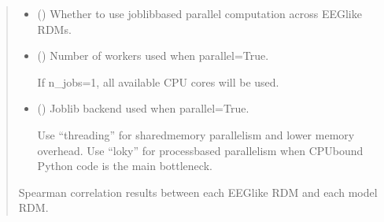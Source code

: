 \documentclass[letterpaper,10pt,english]{sphinxhowto}
\begin{document}
\begin{fulllineitems}
\begin{quote}
\begin{description}
\begin{itemize}
\begin{itemize}
\item {} 
\sphinxAtStartPar
{[}n1, n\_cons, n\_cons{]}

\item {} 
\sphinxAtStartPar
{[}n1, n2, n\_cons, n\_cons{]}

\item {} 
\sphinxAtStartPar
{[}n1, n2, n3, n\_cons, n\_cons{]}

\end{itemize}

\sphinxAtStartPar
The leading dimensions can represent time windows, channels, subjects,
or other analysis dimensions.


\item {} 
\sphinxAtStartPar
{} (\sphinxstyleliteralemphasis{\sphinxupquote{, }}) \textendash{} Whether to use joblib\sphinxhyphen{}based parallel computation across EEG\sphinxhyphen{}like RDMs.

\item {} 
\sphinxAtStartPar
{} (\sphinxstyleliteralemphasis{\sphinxupquote{, }}) \textendash{} 
\sphinxAtStartPar
Number of workers used when parallel=True.

\sphinxAtStartPar
If n\_jobs=\sphinxhyphen{}1, all available CPU cores will be used.


\item {} 
\sphinxAtStartPar
{} (\sphinxstyleliteralemphasis{\sphinxupquote{, }}\sphinxstyleliteralemphasis{\sphinxupquote{, }}) \textendash{} 
\sphinxAtStartPar
Joblib backend used when parallel=True.

\sphinxAtStartPar
Use “threading” for shared\sphinxhyphen{}memory parallelism and lower memory overhead.
Use “loky” for process\sphinxhyphen{}based parallelism when CPU\sphinxhyphen{}bound Python code is
the main bottleneck.


\end{itemize}

\sphinxAtStartPar

\sphinxAtStartPar
{} \textendash{} Spearman correlation results between each EEG\sphinxhyphen{}like RDM and each model RDM.


\end{description}
\end{quote}
\end{fulllineitems}
\end{document}
